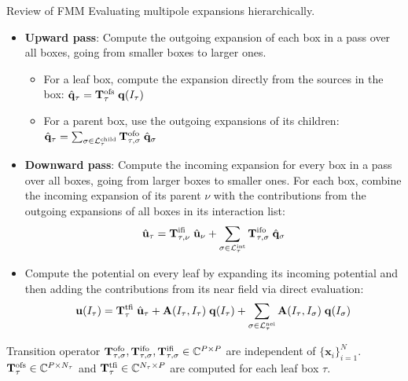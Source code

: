\documentclass[hangout,aspectratio=1610,10pt]{beamer}
\newcommand{\Lchild}{\mathcal{L}^{\text{child}}}
\newcommand{\Lnei}{\mathcal{L}^{\text{nei}}}
\newcommand{\Lint}{\mathcal{L}^{\text{int}}}
\newcommand{\qhat}{\hat{\vb q}}
\newcommand{\uhat}{\hat{\vb u}}
\newcommand{\q}{\vb{q}}
\newcommand{\A}{\vb{A}}
\newcommand{\Tofs}{\vb{T}^{\text{ofs}}}
\newcommand{\Tofo}{\vb{T}^{\text{ofo}}}
\newcommand{\Tifo}{\vb{T}^{\text{ifo}}}
\newcommand{\Tifi}{\vb{T}^{\text{ifi}}}
\newcommand{\Ttfi}{\vb{T}^{\text{tfi}}}
\newcommand{\CC}{\mathbb{C}}
\begin{document}
\begin{frame}{Review of FMM}
    Evaluating multipole expansions hierarchically. 
    \begin{itemize}
        \item \textbf{Upward pass}: Compute the outgoing expansion of each box in a pass over all boxes, going from smaller boxes to larger ones. 
        \begin{itemize}
            \item For a leaf box, compute the expansion directly from the sources in the box: $\qhat_\tau = \Tofs_\tau\; \q(I_\tau)$
            \item For a parent box, use the outgoing expansions of its children: $\qhat_\tau = \sum_{\sigma\in \Lchild_\tau} \Tofo_{\tau, \sigma}\;\qhat_\sigma$
        \end{itemize}
        \item \textbf{Downward pass}: Compute the incoming expansion for every box in a pass over all boxes, going from larger boxes to smaller ones. For each box, combine the incoming expansion of its parent $\nu$ with the contributions from the outgoing expansions of all boxes in its interaction list:\[\uhat_\tau=\Tifi_{\tau,\nu}\;\uhat_\nu+\sum_{\sigma\in\Lint_\tau}\Tifo_{\tau,\sigma}\;\qhat_\sigma\]
        \item Compute the potential on every leaf by expanding its incoming potential and then adding the contributions from its near field via direct evaluation:
        \[\vb u(I_\tau)=\Ttfi_\tau \; \uhat_\tau +\A(I_\tau,I_\tau)\; \q(I_\tau) +
\sum_{\sigma\in \Lnei_\tau}\A(I_\tau,I_\sigma)\; \q(I_\sigma)\]
    \end{itemize}
Transition operator $\Tofo_{\tau,\sigma},  \Tifo_{\tau,\sigma},\Tifi_{\tau,\sigma}\in\CC^{P\times P}$ are independent of $\{\bm x_i\}^N_{i=1}$. $\Tofs_\tau\in \CC^{P\times N_\tau}$ and $\Ttfi_\tau\in\CC^{N_\tau\times P}$ are computed for each leaf box $\tau$.
\end{frame}
\end{document}
